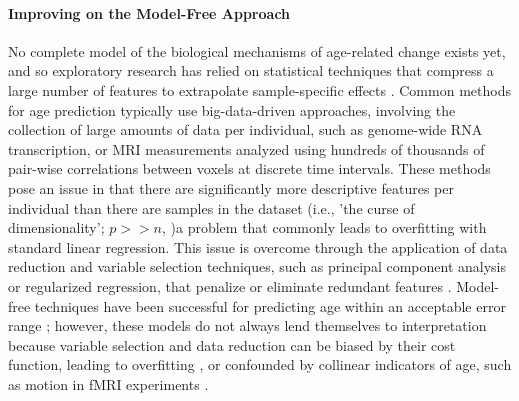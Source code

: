 \documentclass{article}%
\begin{document}
\paragraph*{Improving on the Model-Free Approach} 
No complete model of the biological mechanisms of age-related change exists yet, and so exploratory research has relied on statistical techniques that compress a large number of features to extrapolate sample-specific effects \citep{sagers2020prediction,crimmins2008biomarkers}. Common methods for age prediction typically use big-data-driven approaches, involving the collection of large amounts of data per individual, such as genome-wide RNA transcription, or MRI measurements analyzed using hundreds of thousands of pair-wise correlations between voxels at discrete time intervals. These methods pose an issue in that there are significantly more descriptive features per individual than there are samples in the dataset (i.e., 'the curse of dimensionality'; $p >> n$, \cite{taylor2019})\textemdash a problem that commonly leads to overfitting with standard linear regression. This issue is overcome through the application of data reduction and variable selection techniques, such as principal component analysis or regularized regression, that penalize or eliminate redundant features \citep{lee2017medical}. Model-free techniques have been successful for predicting age within an acceptable error range \citep{cole2017predicting}; however, these models do not always lend themselves to interpretation because variable selection and data reduction can be biased by their cost function, leading to overfitting \citep{babyak2004you}, or confounded by collinear indicators of age, such as motion in fMRI experiments \citep{satterthwaite2013heterogeneous}.
%
\end{document}
